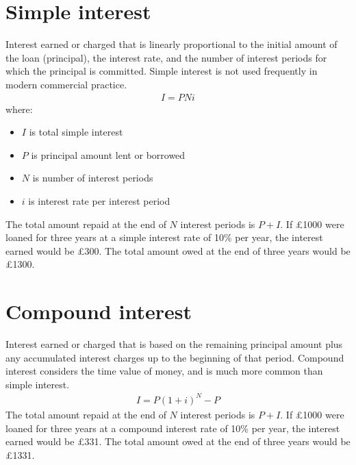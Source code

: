 \section{Simple interest}
Interest earned or charged that is linearly proportional to the initial amount of the loan (principal), the interest rate, and the number of interest periods for which the principal is committed. Simple interest is not used frequently in modern commercial practice.
\begin{gather}
  I = PNi
\end{gather}
where:
\begin{itemize}
  \item $I$ is total simple interest
  \item $P$ is principal amount lent or borrowed
  \item $N$ is number of interest periods
  \item $i$ is interest rate per interest period
\end{itemize}
The total amount repaid at the end of $N$ interest periods is $P+I$. If \pounds 1000 were loaned for three years at a simple interest rate of 10\% per year, the interest earned would be \pounds 300. The total amount owed at the end of three years would be \pounds 1300.
\section{Compound interest}
Interest earned or charged that is based on the remaining principal amount plus any accumulated interest charges up to the beginning of that period. Compound interest considers the time value of money, and is much more common than simple interest.
\begin{gather}
  I = P\left(1 + i\right)^N - P
\end{gather}
The total amount repaid at the end of $N$ interest periods is $P+I$. If \pounds 1000 were loaned for three years at a compound interest rate of 10\% per year, the interest earned would be \pounds 331. The total amount owed at the end of three years would be \pounds 1331.
